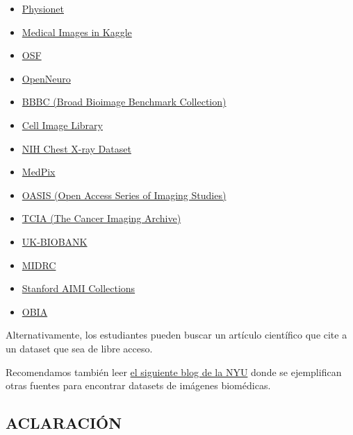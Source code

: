 \documentclass[10pt]{article}
\begin{document}
\begin{itemize}
    \item \href{https://physionet.org/about/database/}{Physionet}
    \item \href{https://www.kaggle.com/datasets/?search=image+medical}{Medical Images in Kaggle}
    \item \href{https://osf.io/}{OSF}
    \item \href{https://openneuro.org/}{OpenNeuro}
    \item \href{https://bbbc.broadinstitute.org/}{BBBC (Broad Bioimage Benchmark Collection)}
    \item \href{https://library.ucsd.edu/dc/search?f%5Bcollection_sim%5D%5B%5D=Cell+Image+Library&id=bb42043698&sort=title_ssi+asc}{Cell Image Library}
    \item \href{https://www.nih.gov/news-events/news-releases/nih-clinical-center-provides-one-largest-publicly-available-chest-x-ray-datasets-scientific-community}{NIH Chest X-ray Dataset}
    \item \href{https://medpix.nlm.nih.gov/home}{MedPix}
    \item \href{https://sites.wustl.edu/oasisbrains/}{OASIS (Open Access Series of Imaging Studies)}
    \item \href{https://www.cancerimagingarchive.net/access-data/?utm_source=chatgpt.com}{TCIA (The Cancer Imaging Archive)}
    \item \href{https://www.ukbiobank.ac.uk/about-our-data/types-of-data/imaging-data}{UK-BIOBANK}
    \item \href{https://collectiveminds.health/articles/medical-imaging-datasets-complete-guide-to-healthcare-data-resources}{MIDRC}
    \item \href{https://aimi.stanford.edu/shared-datasets}{Stanford AIMI Collections}
    \item \href{https://ngdc.cncb.ac.cn/obia/home}{OBIA}
\end{itemize}

Alternativamente, los estudiantes pueden buscar un artículo científico que cite a un dataset que sea de libre acceso.

Recomendamos también leer \href{https://hslguides.med.nyu.edu/medicalimages}{el siguiente blog de la NYU} donde se ejemplifican otras fuentes para encontrar datasets de imágenes biomédicas.

\vspace{0.25cm}

\subsection*{ACLARACIÓN}
\end{document}
